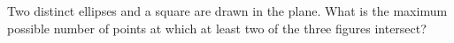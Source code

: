 Two distinct ellipses and a square are drawn in the plane. What is the maximum possible number of points at which at least two of the three figures intersect?

